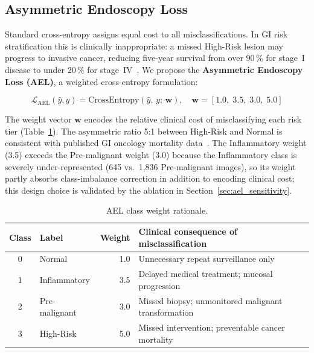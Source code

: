 \documentclass[11pt,a4paper]{article}
\begin{document}
\subsection{Asymmetric Endoscopy Loss}
\label{sec:ael}

Standard cross-entropy assigns equal cost to all misclassifications. In GI
risk stratification this is clinically inappropriate: a missed High-Risk
lesion may progress to invasive cancer, reducing five-year survival from
over 90\,\% for stage~I disease to under 20\,\% for
stage~IV~\citep{Sung2021}. We propose the \textbf{Asymmetric Endoscopy Loss
(AEL)}, a weighted cross-entropy formulation:

\begin{equation}
  \mathcal{L}_{\text{AEL}}(\hat{y}, y) =
    \text{CrossEntropy}(\hat{y},\, y;\, \mathbf{w}), \quad
  \mathbf{w} = [1.0,\; 3.5,\; 3.0,\; 5.0]
  \label{eq:ael}
\end{equation}

The weight vector $\mathbf{w}$ encodes the relative clinical cost of
misclassifying each risk tier (Table~\ref{tab:ael_weights}). The asymmetric
ratio 5:1 between High-Risk and Normal is consistent with published GI
oncology mortality data~\citep{Rawla2019}. The Inflammatory weight (3.5)
exceeds the Pre-malignant weight (3.0) because the Inflammatory class
is severely under-represented (645 vs.\ 1,836 Pre-malignant images),
so its weight partly absorbs class-imbalance correction in addition to
encoding clinical cost; this design choice is validated by the ablation
in Section~\ref{sec:ael_sensitivity}.

\begin{table}[H]
\centering
\caption{AEL class weight rationale.}
\label{tab:ael_weights}
\begin{tabular}{clr p{9cm}}
\toprule
\textbf{Class} & \textbf{Label} & \textbf{Weight} &
\textbf{Clinical consequence of misclassification}\\
\midrule
0 & Normal        & 1.0 & Unnecessary repeat surveillance only\\
1 & Inflammatory  & 3.5 & Delayed medical treatment; mucosal progression\\
2 & Pre-malignant & 3.0 & Missed biopsy; unmonitored malignant transformation\\
3 & High-Risk     & 5.0 & Missed intervention; preventable cancer mortality\\
\bottomrule
\end{tabular}
\end{table}
\end{document}
